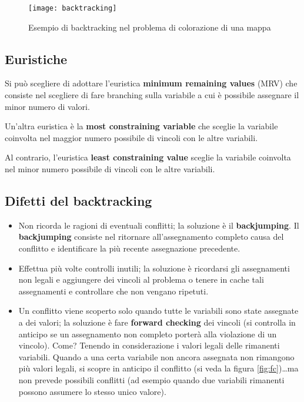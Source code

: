 \begin{figure}[H]
\caption{Esempio di backtracking nel problema di colorazione di una mappa}
\centering
\texttt{[image: backtracking]}
\end{figure}

\subsection{Euristiche}

Si può scegliere di adottare l'euristica \textbf{minimum remaining values}
(MRV) che consiste nel scegliere di fare branching sulla variabile a cui è
possibile assegnare il minor numero di valori.

Un'altra euristica è la \textbf{most constraining variable} che sceglie la
variabile coinvolta nel maggior numero possibile di vincoli con le altre variabili.

Al contrario, l'euristica \textbf{least constraining value} sceglie la
variabile coinvolta nel minor numero possibile di vincoli con le altre variabili.\\

\subsection{Difetti del backtracking}


\begin{itemize}
 \item Non ricorda le ragioni di eventuali conflitti; la soluzione è il
\textbf{backjumping}.
Il \textbf{backjumping} consiste nel ritornare all'assegnamento completo causa del
conflitto e identificare la più recente assegnazione precedente.

 \item Effettua più volte controlli inutili; la soluzione è ricordarsi gli assegnamenti
non legali e aggiungere dei vincoli al problema o tenere in cache tali assegnamenti
e controllare che non vengano ripetuti.

 \item Un conflitto viene scoperto solo quando tutte le variabili sono state assegnate a
dei valori; la soluzione è fare \textbf{forward checking} dei vincoli (si controlla
in anticipo se un assegnamento non completo porterà alla violazione di un vincolo).
Come? Tenendo in considerazione i valori legali delle rimanenti variabili. Quando a
una certa variabile non ancora assegnata non rimangono più valori legali, si scopre
in anticipo il conflitto (si veda la figura \ref{fig:fc})\dots ma non prevede
possibili conflitti (ad esempio quando due variabili rimanenti possono assumere lo stesso
unico valore).
\end{itemize}

